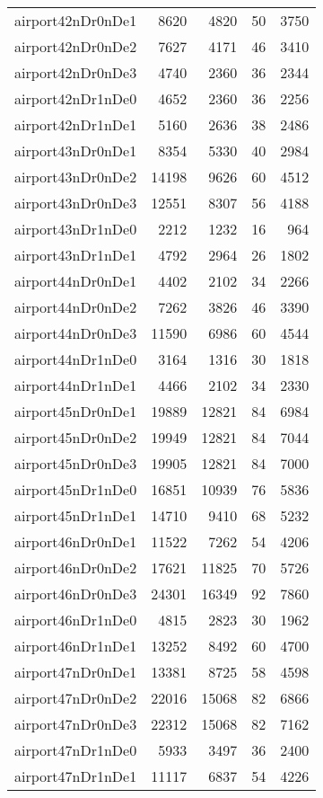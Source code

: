 \begin{longtable}{lrrrr}
airport42nDr0nDe1 & 8620 & 4820 & 50 & 3750 \\
airport42nDr0nDe2 & 7627 & 4171 & 46 & 3410 \\
airport42nDr0nDe3 & 4740 & 2360 & 36 & 2344 \\
airport42nDr1nDe0 & 4652 & 2360 & 36 & 2256 \\
airport42nDr1nDe1 & 5160 & 2636 & 38 & 2486 \\
airport43nDr0nDe1 & 8354 & 5330 & 40 & 2984 \\
airport43nDr0nDe2 & 14198 & 9626 & 60 & 4512 \\
airport43nDr0nDe3 & 12551 & 8307 & 56 & 4188 \\
airport43nDr1nDe0 & 2212 & 1232 & 16 & 964 \\
airport43nDr1nDe1 & 4792 & 2964 & 26 & 1802 \\
airport44nDr0nDe1 & 4402 & 2102 & 34 & 2266 \\
airport44nDr0nDe2 & 7262 & 3826 & 46 & 3390 \\
airport44nDr0nDe3 & 11590 & 6986 & 60 & 4544 \\
airport44nDr1nDe0 & 3164 & 1316 & 30 & 1818 \\
airport44nDr1nDe1 & 4466 & 2102 & 34 & 2330 \\
airport45nDr0nDe1 & 19889 & 12821 & 84 & 6984 \\
airport45nDr0nDe2 & 19949 & 12821 & 84 & 7044 \\
airport45nDr0nDe3 & 19905 & 12821 & 84 & 7000 \\
airport45nDr1nDe0 & 16851 & 10939 & 76 & 5836 \\
airport45nDr1nDe1 & 14710 & 9410 & 68 & 5232 \\
airport46nDr0nDe1 & 11522 & 7262 & 54 & 4206 \\
airport46nDr0nDe2 & 17621 & 11825 & 70 & 5726 \\
airport46nDr0nDe3 & 24301 & 16349 & 92 & 7860 \\
airport46nDr1nDe0 & 4815 & 2823 & 30 & 1962 \\
airport46nDr1nDe1 & 13252 & 8492 & 60 & 4700 \\
airport47nDr0nDe1 & 13381 & 8725 & 58 & 4598 \\
airport47nDr0nDe2 & 22016 & 15068 & 82 & 6866 \\
airport47nDr0nDe3 & 22312 & 15068 & 82 & 7162 \\
airport47nDr1nDe0 & 5933 & 3497 & 36 & 2400 \\
airport47nDr1nDe1 & 11117 & 6837 & 54 & 4226 \\

\end{longtable}
